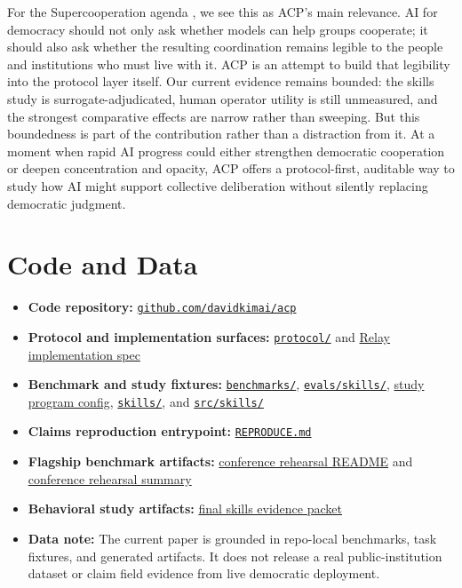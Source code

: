 \documentclass[11pt]{article}
\newcommand{\repobase}{https://github.com/davidkimai/acp}
\newcommand{\reporoot}[1]{\href{\repobase}{\nolinkurl{#1}}}
\newcommand{\repodir}[2]{\href{\repobase/tree/main/#1}{\nolinkurl{#2}}}
\newcommand{\repofile}[2]{\href{\repobase/blob/main/#1}{\nolinkurl{#2}}}
\begin{document}
\vspace{0.1in}
For the Supercooperation agenda \cite{Foresight2026Supercooperation}, we see this as ACP's main relevance. AI for democracy should not only ask whether models can help groups cooperate; it should also ask whether the resulting coordination remains legible to the people and institutions who must live with it. ACP is an attempt to build that legibility into the protocol layer itself. Our current evidence remains bounded: the skills study is surrogate-adjudicated, human operator utility is still unmeasured, and the strongest comparative effects are narrow rather than sweeping. But this boundedness is part of the contribution rather than a distraction from it. At a moment when rapid AI progress could either strengthen democratic cooperation or deepen concentration and opacity, ACP offers a protocol-first, auditable way to study how AI might support collective deliberation without silently replacing democratic judgment.

\section*{Code and Data}

\begin{itemize}[label={-}, itemsep=2pt]
    \item \textbf{Code repository:} \reporoot{github.com/davidkimai/acp}
    \item \textbf{Protocol and implementation surfaces:} \repodir{protocol}{protocol/} and \href{https://github.com/davidkimai/acp/blob/main/docs/specs/RELAY_REFERENCE_IMPLEMENTATION_SPEC.md}{Relay implementation spec}
    \item \textbf{Benchmark and study fixtures:} \repodir{benchmarks}{benchmarks/}, \repodir{evals/skills}{evals/skills/}, \href{https://github.com/davidkimai/acp/blob/main/evals/skills/studies/v3-study-program.json}{study program config}, \repodir{skills}{skills/}, and \repodir{src/skills}{src/skills/}
    \item \textbf{Claims reproduction entrypoint:} \repofile{REPRODUCE.md}{REPRODUCE.md}
    \item \textbf{Flagship benchmark artifacts:} \href{https://github.com/davidkimai/acp/blob/main/artifacts/conference/rehearsal/README.md}{conference rehearsal README} and \href{https://github.com/davidkimai/acp/blob/main/artifacts/conference/rehearsal/rehearsal-summary.json}{conference rehearsal summary}
    \item \textbf{Behavioral study artifacts:} \href{https://github.com/davidkimai/acp/tree/main/artifacts/evals/skills/final}{final skills evidence packet}
    \item \textbf{Data note:} The current paper is grounded in repo-local benchmarks, task fixtures, and generated artifacts. It does not release a real public-institution dataset or claim field evidence from live democratic deployment.
\end{itemize}
\end{document}
